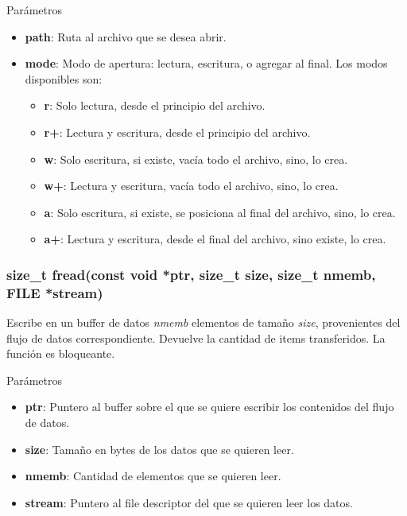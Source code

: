\documentclass[a4paper, twoside]{article}
\begin{document}
\begin{parametros*}{Parámetros}
	\begin{itemize}
		\item \textbf{path}: Ruta al archivo que se desea abrir.
		\item \textbf{mode}: Modo de apertura: lectura, escritura, o agregar al final. Los modos disponibles son:
		\begin{itemize}
			\item \textbf{r}: Solo lectura, desde el principio del archivo.
			\item \textbf{r+}: Lectura y escritura, desde el principio del archivo.
			\item \textbf{w}: Solo escritura, si existe, vacía todo el archivo, sino, lo crea.
			\item \textbf{w+}: Lectura y escritura, vacía todo el archivo, sino, lo crea.
			\item \textbf{a}: Solo escritura, si existe, se posiciona al final del archivo, sino, lo crea.
			\item \textbf{a+}: Lectura y escritura, desde el final del archivo, sino existe, lo crea.
		\end{itemize}
	\end{itemize}
\end{parametros*}

\subsubsection {size\_t fread(const void *ptr, size\_t size, size\_t nmemb, FILE *stream)}
Escribe en un buffer de datos \emph{nmemb} elementos de tamaño \emph{size}, provenientes del flujo de datos correspondiente. Devuelve la cantidad de items transferidos. La función es bloqueante.

\begin{parametros*}{Parámetros}
	\begin{itemize}
		\item \textbf{ptr}: Puntero al buffer sobre el que se quiere escribir los contenidos del flujo de datos.
		\item \textbf{size}: Tamaño en bytes de los datos que se quieren leer.
		\item \textbf{nmemb}: Cantidad de elementos que se quieren leer.
		\item \textbf{stream}: Puntero al file descriptor del que se quieren leer los datos.
	\end{itemize}
\end{parametros*}
\end{document}
